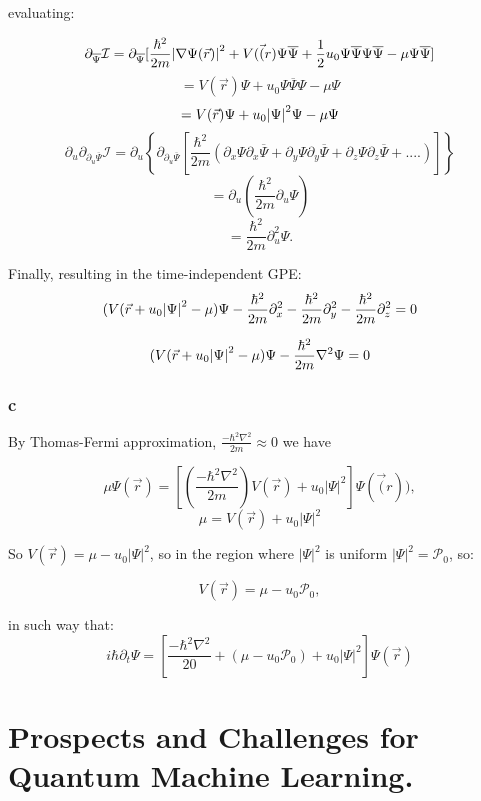\documentclass[12pt]{article}
\begin{document}
\begin{flushleft}
evaluating:

\[
\partial_{\overline{\Psi}} \mathbf{\mathcal{I}} = \partial_{\overline{\Psi}} [\frac{\hbar^{2}}{2m} \abs{\nabla \Psi(\vec{r})}^{2} + V(\vec(r) \Psi \overline{\Psi} + \frac{1}{2} u_{0} \Psi \overline{\Psi} \Psi \overline{\Psi} - \mu \Psi \overline{\Psi} ]
\]
\[
= V(\vec{r}) \Psi + u_{0} \Psi \overline{\Psi} \Psi - \mu \Psi
\]
\[
= V(\vec{r})\Psi + u_{0} \abs{\Psi}^{2}\Psi - \mu \Psi
\]
\[
\partial_{u} \partial_{\partial_{u}\overline{\Psi}}\mathbf{\mathcal{I}} = \partial_{u} \left\{ \partial_{\partial_{u}\overline{\Psi}}\left[\frac{\hbar^{2}}{2m}(\partial_{x}\Psi \partial_{x}\overline{\Psi} + \partial_{y}\Psi \partial_{y}\overline{\Psi} + \partial_{z}\Psi \partial_{z}\overline{\Psi} + ....)\right]\right\}
\]
\[
= \partial_{u} \left(\frac{\hbar^{2}}{2m} \partial_{u} \Psi \right)
\]
\[
= \frac{\hbar^{2}}{2m} \partial_{u}^{2} \Psi.
\]

Finally, resulting in the time-independent GPE:
\[
(V(\vec{r} + u_{0} \abs{\Psi}^{2} - \mu)\Psi - \frac{\hbar^{2}}{2m} \partial_{x}^{2} - \frac{\hbar^{2}}{2m} \partial_{y}^{2} - \frac{\hbar^{2}}{2m} \partial_{z}^{2} = 0
\]

\[
(V(\vec{r} + u_{0} \abs{\Psi}^{2} - \mu)\Psi - \frac{\hbar^{2}}{2m} \nabla^{2} \Psi = 0
\]


\subsubsection*{c}
By Thomas-Fermi approximation, \(\frac{- \hbar^{2} \nabla^{2}}{2m} \approx 0 \) we have

\[
\mu \Psi(\vec{r}) = \left[ \left( \frac{- \hbar^{2} \nabla^{2}}{2m} \right) V(\vec{r}) + u_0 |\Psi|^{2} \right] \Psi(\vec(r)),
\]
\[
\mu =  V(\vec{r}) + u_0 |\Psi|^{2}
\]

So \(V(\vec{r}) = \mu - u_0 |\Psi|^{2}\), so in the region where \( | \Psi |^{2}\) is uniform   \( | \Psi |^{2} = \mathcal{P}_0\), so:

\[
V(\vec{r}) = \mu - u_0 \mathcal{P}_0,
\]

in such way that:
\[
i \hbar \partial_{t} \Psi = \left[ \frac{- \hbar^{2} \nabla^{2}}{20} + (\mu - u_0 \mathcal{P}_0) + u_0 | \Psi|^{2}  \right] \Psi(\vec{r})
\]





\section*{Prospects and Challenges for Quantum Machine Learning.}


\end{flushleft}
\end{document}
